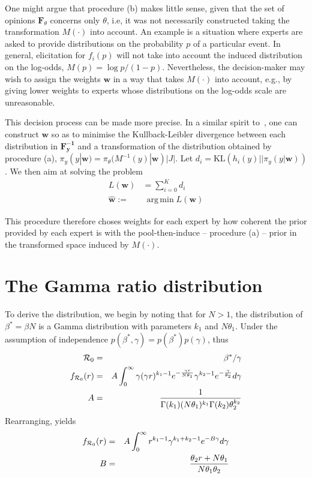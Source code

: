 \documentclass[11pt]{article}
\DeclareMathOperator*{\argmin}{arg\,min}
\begin{document}
One might argue that procedure (b) makes little sense, given that the set of opinions $\mathbf{F}_{\theta}$ concerns only $\theta$, i.e, it was not necessarily constructed taking the transformation $M(\cdot)$ into account.
An example is a situation where experts are asked to provide distributions on the probability $p$ of a particular event.
In general, elicitation for $f_i(p)$ will not take into account the induced distribution on the log-odds, $M(p) = \log p/(1-p)$.
Nevertheless, the decision-maker may wish to assign the weights $\mathbf{w}$ in a way that takes $M(\cdot)$ into account, e.g., by giving lower weights to experts whose distributions on the log-odds scale are unreasonable.

This decision process can be made more precise.
In a similar spirit to~\citep{carvalho2016}, one can construct $\mathbf{w}$ so as to minimise the Kullback-Leibler divergence between each distribution in $\mathbf{F^{-1}_y}$ and a transformation of the distribution obtained by procedure (a), $\pi_{y}(y | \mathbf{w}) = \pi_{\theta}( M^{-1}(y)| \mathbf{w})|J|$.
Let $d_i = \text{KL}( h_i(y) || \pi_{y}(y | \mathbf{w}))$.
We then aim at solving the problem
\begin{align}
L(\mathbf{w}) &= \sum_{i=0}^Kd_i \\
     \hat{\mathbf{w}}:=& \:\argmin L(\mathbf{w})  \nonumber
\end{align}

This procedure therefore choses weights for each expert by how coherent the prior provided by each expert is with the pool-then-induce -- procedure (a) -- prior in the transformed space induced by $M(\cdot)$.
\section{The Gamma ratio distribution}

To derive the distribution, we begin by noting that for $N > 1$, the distribution of $\beta^{\ast} = \beta N$ is a Gamma distribution with parameters $k_1$ and $N\theta_1$.
Under the assumption of independence $p(\beta^{\ast}, \gamma) = p(\beta^{\ast})p(\gamma)$, thus
\begin{eqnarray}
{\cal R}_0 &=& \beta^{\ast}/\gamma\\
f_{{\cal R}_0}(r) &=& A \int_{0}^{\infty} \gamma(\gamma r)^{k_1 -1} e^{-\frac{\gamma r}{N\theta_1}} \gamma^{k_2 -1} e^{-\frac{\gamma}{\theta_2}} d\gamma \\
A &=& \frac{1}{\Gamma(k_1)(N\theta_1)^{k_1}\Gamma(k_2)\theta_2^{k_2}}
\end{eqnarray}
Rearranging, yields
\begin{eqnarray}
\label{eq:toint}
f_{{\cal R}_0}(r) &=& A \int_{0}^{\infty} r^{k_1 -1} \gamma^{k_1 + k_2 -1} e^{-B\gamma} d\gamma \\
        B  &=& \frac{\theta_2 r + N\theta_1}{N\theta_1\theta_2}
\end{eqnarray}
\end{document}
